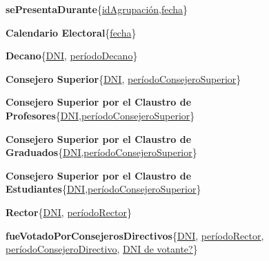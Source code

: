 \documentclass[a4paper, 10pt, twoside]{article}
\begin{document}
\textbf{sePresentaDurante}\{\underline{\underline{idAgrupación}},\underline{\underline{fecha}}\}

\textbf{Calendario Electoral}\{\underline{fecha}\}

\textbf{Decano}\{\underline{\underline{DNI}}, \underline{períodoDecano}\}

\textbf{Consejero Superior}\{\underline{\underline{DNI}}, \underline{períodoConsejeroSuperior}\}

\textbf{Consejero Superior por el Claustro de Profesores}\{\underline{\underline{DNI}},\underline{\underline{períodoConsejeroSuperior}}\}

\textbf{Consejero Superior por el Claustro de Graduados}\{\underline{\underline{DNI}},\underline{\underline{períodoConsejeroSuperior}}\}

\textbf{Consejero Superior por el Claustro de Estudiantes}\{\underline{\underline{DNI}},\underline{\underline{períodoConsejeroSuperior}}\}

\textbf{Rector}\{\underline{\underline{DNI}}, \underline{períodoRector}\}

\textbf{fueVotadoPorConsejerosDirectivos}\{\underline{\underline{DNI}}, \underline{\underline{períodoRector}}, \underline{\underline{períodoConsejeroDirectivo}}, \underline{\underline{DNI de votante?}}\}
\end{document}
